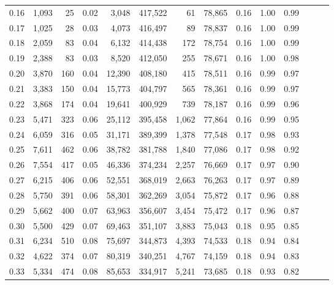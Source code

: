 \begin{tabular}{rrrrrrrrrrrrrr}
0.16 &   1,093 &     25 &  0.02 &    3,048 &  417,522 &      61 &  78,865 &  0.16 &  1.00 &      0.99 \\
0.17 &   1,025 &     28 &  0.03 &    4,073 &  416,497 &      89 &  78,837 &  0.16 &  1.00 &      0.99 \\
0.18 &   2,059 &     83 &  0.04 &    6,132 &  414,438 &     172 &  78,754 &  0.16 &  1.00 &      0.99 \\
0.19 &   2,388 &     83 &  0.03 &    8,520 &  412,050 &     255 &  78,671 &  0.16 &  1.00 &      0.98 \\
0.20 &   3,870 &    160 &  0.04 &   12,390 &  408,180 &     415 &  78,511 &  0.16 &  0.99 &      0.97 \\
0.21 &   3,383 &    150 &  0.04 &   15,773 &  404,797 &     565 &  78,361 &  0.16 &  0.99 &      0.97 \\
0.22 &   3,868 &    174 &  0.04 &   19,641 &  400,929 &     739 &  78,187 &  0.16 &  0.99 &      0.96 \\
0.23 &   5,471 &    323 &  0.06 &   25,112 &  395,458 &   1,062 &  77,864 &  0.16 &  0.99 &      0.95 \\
0.24 &   6,059 &    316 &  0.05 &   31,171 &  389,399 &   1,378 &  77,548 &  0.17 &  0.98 &      0.93 \\
0.25 &   7,611 &    462 &  0.06 &   38,782 &  381,788 &   1,840 &  77,086 &  0.17 &  0.98 &      0.92 \\
0.26 &   7,554 &    417 &  0.05 &   46,336 &  374,234 &   2,257 &  76,669 &  0.17 &  0.97 &      0.90 \\
0.27 &   6,215 &    406 &  0.06 &   52,551 &  368,019 &   2,663 &  76,263 &  0.17 &  0.97 &      0.89 \\
0.28 &   5,750 &    391 &  0.06 &   58,301 &  362,269 &   3,054 &  75,872 &  0.17 &  0.96 &      0.88 \\
0.29 &   5,662 &    400 &  0.07 &   63,963 &  356,607 &   3,454 &  75,472 &  0.17 &  0.96 &      0.87 \\
0.30 &   5,500 &    429 &  0.07 &   69,463 &  351,107 &   3,883 &  75,043 &  0.18 &  0.95 &      0.85 \\
0.31 &   6,234 &    510 &  0.08 &   75,697 &  344,873 &   4,393 &  74,533 &  0.18 &  0.94 &      0.84 \\
0.32 &   4,622 &    374 &  0.07 &   80,319 &  340,251 &   4,767 &  74,159 &  0.18 &  0.94 &      0.83 \\
0.33 &   5,334 &    474 &  0.08 &   85,653 &  334,917 &   5,241 &  73,685 &  0.18 &  0.93 &      0.82 \\

\end{tabular}
